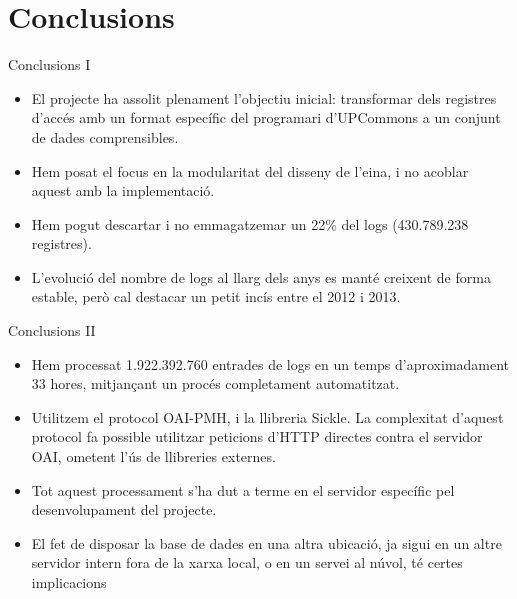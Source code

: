 \section{Conclusions}\label{sec:conclusions}

\begin{frame}{Conclusions I}

\begin{itemize}
    \item El projecte ha assolit plenament l’objectiu inicial: transformar dels registres d’accés amb un format específic del programari d’UPCommons a un conjunt de dades comprensibles.
    \item Hem posat el focus en la modularitat del disseny de l'eina, i no acoblar aquest amb la implementació.
    \item Hem pogut descartar i no emmagatzemar un 22\% del logs (430.789.238 registres).
    \item L’evolució del nombre de logs al llarg dels anys es manté creixent de forma estable, però cal destacar un petit incís entre el 2012 i 2013.
\end{itemize}

\end{frame}

\begin{frame}{Conclusions II}

    \begin{itemize}
        \item Hem processat 1.922.392.760 entrades de logs en un temps d’aproximadament 33 hores, mitjançant un procés completament automatitzat.
        \item Utilitzem el protocol OAI-PMH, i la llibreria Sickle.
        La complexitat d’aquest protocol fa possible utilitzar peticions d’HTTP directes contra el servidor OAI, ometent l’ús de llibreries externes.
        \item Tot aquest processament s’ha dut a terme en el servidor específic pel desenvolupament del projecte.
        \item El fet de disposar la base de dades en una altra ubicació, ja sigui en un altre servidor intern fora de la xarxa local, o en un servei al núvol, té certes implicacions
    \end{itemize}

\end{frame}

